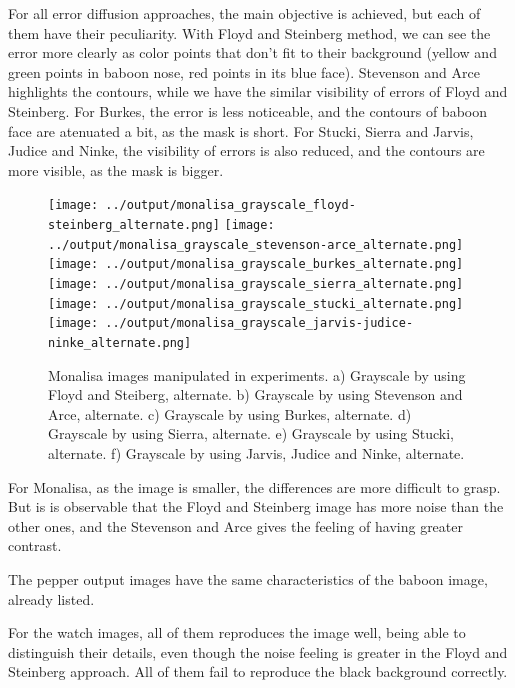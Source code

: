 \documentclass[]{IEEEtran}
\begin{document}
For all error diffusion approaches, the main objective is achieved, but each of them have their peculiarity. With Floyd and Steinberg method, we can see the error more clearly as color points that don't fit to their background (yellow and green points in baboon nose, red points in its blue face). Stevenson and Arce highlights the contours, while we have the similar visibility of errors of Floyd and Steinberg. For Burkes, the error is less noticeable, and the contours of baboon face are atenuated a bit, as the mask is short. For Stucki, Sierra and Jarvis, Judice and Ninke, the visibility of errors is also reduced, and the contours are more visible, as the mask is bigger.   

\begin{figure}[H]
  \centering
  \texttt{[image: ../output/monalisa\_grayscale\_floyd-steinberg\_alternate.png]}
  \texttt{[image: ../output/monalisa\_grayscale\_stevenson-arce\_alternate.png]}
  \texttt{[image: ../output/monalisa\_grayscale\_burkes\_alternate.png]}
  \texttt{[image: ../output/monalisa\_grayscale\_sierra\_alternate.png]}
  \texttt{[image: ../output/monalisa\_grayscale\_stucki\_alternate.png]}
  \texttt{[image: ../output/monalisa\_grayscale\_jarvis-judice-ninke\_alternate.png]}
  \caption{Monalisa images manipulated in experiments. a) Grayscale by using Floyd and Steiberg, alternate. b) Grayscale by using Stevenson and Arce, alternate. c) Grayscale by using Burkes, alternate. d) Grayscale by using Sierra, alternate. e) Grayscale by using Stucki, alternate. f) Grayscale by using Jarvis, Judice and Ninke, alternate. }
  \label{fig:methods-monalisa}
\end{figure}

For Monalisa, as the image is smaller, the differences are more difficult to grasp. But is is observable that the Floyd and Steinberg image has more noise than the other ones, and the Stevenson and Arce gives the feeling of having greater contrast. 

The pepper output images have the same characteristics of the baboon image, already listed.

For the watch images, all of them reproduces the image well, being able to distinguish their details, even though the noise feeling is greater in the Floyd and Steinberg approach. All of them fail to reproduce the black background correctly. 
\end{document}
